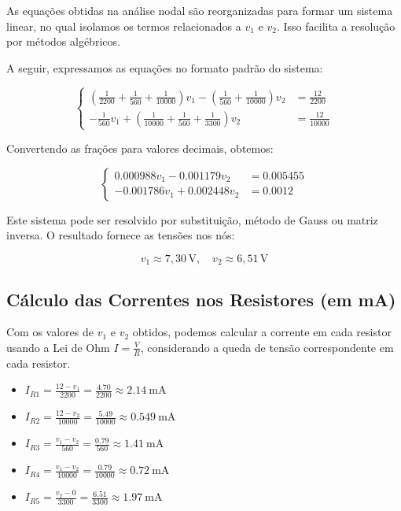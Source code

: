 As equações obtidas na análise nodal são reorganizadas para formar um sistema
linear, no qual isolamos os termos relacionados a \(v_1\) e \(v_2\). Isso
facilita a resolução por métodos algébricos.

A seguir, expressamos as equações no formato padrão do sistema:

\[
\left\{
\begin{aligned}
  \left( \frac{1}{2200} + \frac{1}{560} + \frac{1}{10000} \right)v_1 - \left( \frac{1}{560} + \frac{1}{10000} \right)v_2 &= \frac{12}{2200} \\
  - \frac{1}{560}v_1 + \left( \frac{1}{10000} + \frac{1}{560} + \frac{1}{3300} \right)v_2 &= \frac{12}{10000}
\end{aligned}
\right.
\]

Convertendo as frações para valores decimais, obtemos:

\[
\left\{
\begin{aligned}
  0.000988v_1 - 0.001179v_2 &= 0.005455 \\
  -0.001786v_1 + 0.002448v_2 &= 0.0012
\end{aligned}
\right.
\]

Este sistema pode ser resolvido por substituição, método de Gauss ou matriz
inversa. O resultado fornece as tensões nos nós:

\[
  v_1 \approx 7{,}30\,\text{V}, \quad v_2 \approx 6{,}51\,\text{V}
\]

\subsection{Cálculo das Correntes nos Resistores (em mA)}

Com os valores de \(v_1\) e \(v_2\) obtidos, podemos calcular a corrente em cada
resistor usando a Lei de Ohm \(I = \frac{V}{R}\), considerando a queda de tensão
correspondente em cada resistor.

\begin{itemize}
  \item 
    \(I_{R1} = \frac{12 - v_1}{2200} = \frac{4.70}{2200} \approx \SI{2.14}{\milli\ampere}\)
  \item
    \(I_{R2} = \frac{12 - v_2}{10000} = \frac{5.49}{10000} \approx \SI{0.549}{\milli\ampere}\)
  \item
    \(I_{R3} = \frac{v_1 - v_2}{560} = \frac{0.79}{560} \approx \SI{1.41}{\milli\ampere}\)
  \item
    \(I_{R4} = \frac{v_1 - v_2}{10000} = \frac{0.79}{10000} \approx \SI{0.72}{\milli\ampere}\)
  \item
    \(I_{R5} = \frac{v_2 - 0}{3300} = \frac{6.51}{3300} \approx \SI{1.97}{\milli\ampere}\)
\end{itemize}

